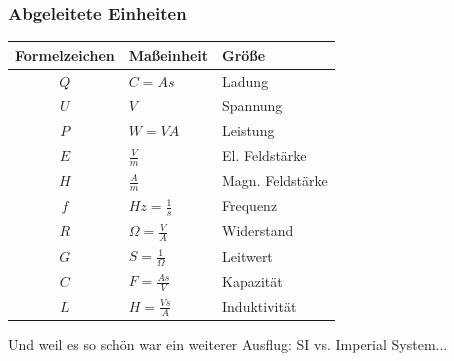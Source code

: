 \begin{frame}
    \frametitle{Abgeleitete Einheiten}

    \begin{center}
    \footnotesize
    \begin{tabular}{|c|l|l|}\hline
        \textbf{Formelzeichen} & \textbf{Maßeinheit} & \textbf{Größe} \\ \hline \hline
        $Q$ & $C = As$                & Ladung          \\ \hline
        $U$ & $V$                     & Spannung        \\ \hline
        $P$ & $W = VA$                & Leistung        \\ \hline
        $E$ & $\frac{V}{m}$           & El. Feldstärke  \\ \hline
        $H$ & $\frac{A}{m}$           & Magn. Feldstärke\\ \hline
        $f$ & $Hz = \frac{1}{s}$      & Frequenz        \\ \hline
        $R$ & $\Omega = \frac{V}{A}$  & Widerstand      \\ \hline
        $G$ & $S = \frac{1}{\Omega}$  & Leitwert        \\ \hline
        $C$ & $F = \frac{As}{V}$      & Kapazität       \\ \hline
        $L$ & $H = \frac{Vs}{A}$      & Induktivität    \\ \hline
    \end{tabular}
    \end{center}


    Und weil es so schön war ein weiterer Ausflug: SI vs. Imperial System...

\end{frame}

